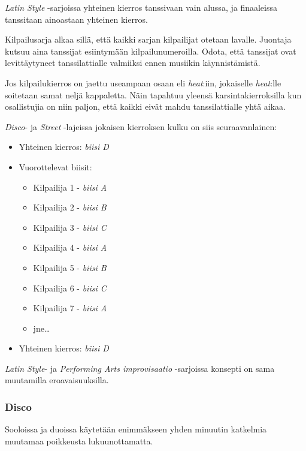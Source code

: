 \documentclass[12pt, a4paper, oneside]{article}
\begin{document}
\textit{Latin Style} -sarjoissa yhteinen kierros tanssivaan vain alussa,
ja finaaleissa tanssitaan ainoastaan yhteinen kierros.

Kilpailusarja alkaa sillä,
että kaikki sarjan kilpailijat otetaan lavalle.
Juontaja kutsuu aina tanssijat esiintymään kilpailunumeroilla.
Odota, että tanssijat ovat levittäytyneet tanssilattialle valmiiksi ennen musiikin käynnistämistä.

Jos kilpailukierros on jaettu useampaan osaan eli \textit{heat}:iin,
jokaiselle \textit{heat}:lle soitetaan samat neljä kappaletta.
Näin tapahtuu yleensä karsintakierroksilla kun osallistujia on niin paljon,
että kaikki eivät mahdu tanssilattialle yhtä aikaa.

\textit{Disco}- ja \textit{Street} -lajeissa jokaisen kierroksen kulku on siis seuraavanlainen:

\begin{itemize}[nosep]
    \item Yhteinen kierros: \textit{biisi D}
    \item Vuorottelevat biisit:
        \begin{itemize}
            \item Kilpailija 1 - \textit{biisi A}
            \item Kilpailija 2 - \textit{biisi B}
            \item Kilpailija 3 - \textit{biisi C}
            \item Kilpailija 4 - \textit{biisi A}
            \item Kilpailija 5 - \textit{biisi B}
            \item Kilpailija 6 - \textit{biisi C}
            \item Kilpailija 7 - \textit{biisi A}
            \item jne\ldots
        \end{itemize}
    \item Yhteinen kierros: \textit{biisi D}
\end{itemize}

\textit{Latin Style}- ja \textit{Performing Arts improvisaatio} -sarjoissa konsepti on sama muutamilla eroavaisuuksilla.

\subsubsection{Disco}

Sooloissa ja duoissa käytetään enimmäkseen yhden minuutin katkelmia muutamaa poikkeusta lukuunottamatta.
\end{document}
